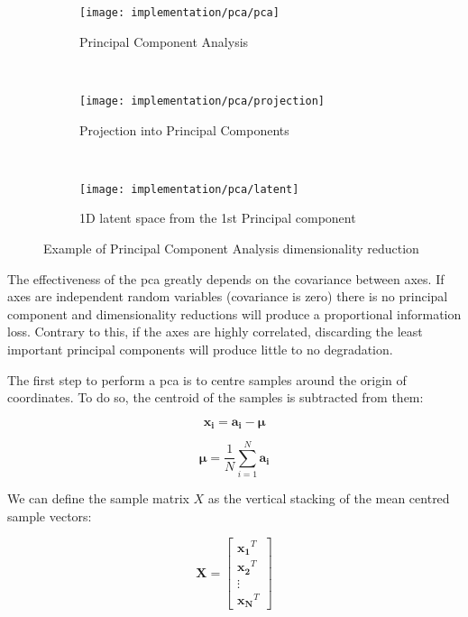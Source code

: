 \documentclass[../main.tex]{subfiles}
\begin{document}
\begin{figure}[htbp]
    \centering
    \begin{subfigure}[b]{\textwidth}
         \centering
         \texttt{[image: implementation/pca/pca]}
         \caption{Principal Component Analysis}
    \end{subfigure}\\
    \vspace{2em}
    \begin{subfigure}[b]{\textwidth}
         \centering
         \texttt{[image: implementation/pca/projection]}
         \caption{Projection into Principal Components}
    \end{subfigure}\\
    \vspace{2em}
    \begin{subfigure}[b]{\textwidth}
         \centering
         \texttt{[image: implementation/pca/latent]}
         \caption{1D latent space from the 1st Principal component}
    \end{subfigure}

    \caption{Example of Principal Component Analysis dimensionality reduction}
    \label{fig:4:pca}
\end{figure}

The effectiveness of the \gls{pca} greatly depends on the covariance between axes. If axes are independent random variables (covariance is zero) there is no principal component and dimensionality reductions will produce a proportional information loss. Contrary to this, if the axes are highly correlated, discarding the least important principal components will produce little to no degradation\cite{shalizi2012}\cite{jolliffe2002}.

The first step to perform a \gls{pca} is to centre samples around the origin of coordinates. To do so, the centroid of the samples is subtracted from them:

\begin{equation}
    \bm{x_i} = \bm{a_i} - \bm{\mu}
\end{equation}

\begin{equation}
    \bm{\mu} = \frac{1}{N}\sum_{i=1}^{N} \bm{a_i}
\end{equation}

We can define the sample matrix $X$ as the vertical stacking of the mean centred sample vectors:

\begin{equation}
    \bm{X} = 
    \begin{bmatrix}
        \bm{x_1}^T \\
        \bm{x_2}^T \\
        \vdots \\
        \bm{x_N}^T
    \end{bmatrix}
\end{equation}
\end{document}

